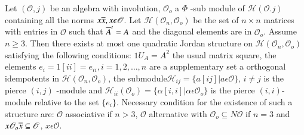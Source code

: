 \begin{thm}\label{c2:thm1}
Let $(\mathscr{O},j)$ be an algebra with involution, $\mathscr{O}_o$ a
$\Phi$ -sub module of $\mathscr{H}(\mathscr{O}.j)$ containing all
the norms $x\overline{x},x\epsilon \mathscr{O}$. Let
$\mathscr{H}(\mathscr{O}_n,\mathscr{O}_o)$ be the set of $n\times n$
matrices with entries in $\mathscr{O}$ such that $\overline{A}^{t}=A$ and
the diagonal elements are in $\mathscr{O}_o$. Assume $n\ge 3$. Then
there exists at most one quadratic Jordan structure on
$\mathscr{H}(\mathscr{O}_n,\mathscr{O}_o)$ satisfying the following
conditions: $1U_A=A^{2}$ the usual matrix square, the elements
$e_i=1[ii]=e_{ii},i=1,2,\ldots,n$ are a supplementary set a orthogonal
idempotents in $\mathscr{H}(\mathscr{O}_n,\mathscr{O}_o)$, the
submodule\pageoriginale $\mathscr{H}_{ij} =\{a[ij]|a\epsilon
\mathscr{O}\}$, $i\neq j$ is the pierce $(i,j)$ -module and
$\mathscr{H}_{ii}(\mathscr{O}_o)=\{\alpha[i,i]|\alpha\epsilon
\mathscr{O}_o\}$ is the pierce $(i,i)$-module relative to the set
$\{e_i\}$. Necessary condition for the existence of such a structure
are: $\mathscr{O}$ associative if $n>3$, $\mathscr{O}$ alternative
with $\mathscr{O}_o\subseteq N\mathscr{O}$ if $n=3$ and
$x\mathscr{O}_o\overline{x}\subseteq\mathscr{O}$, $x\epsilon \mathscr{O}$.
\end{thm}

